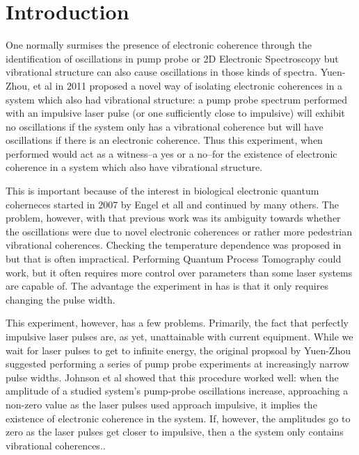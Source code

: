 \section{Introduction}
One normally surmises the presence of electronic coherence through the identification of oscillations in pump probe or 2D Electronic Spectroscopy but vibrational structure can also cause oscillations in those kinds of spectra.  Yuen-Zhou, et al\cite{witness}  in 2011 proposed a novel way of isolating electronic coherences in a system which also had vibrational structure: a pump probe spectrum performed with an impulsive laser pulse (or one sufficiently close to impulsive) will exhibit no oscillations if the system only has a vibrational coherence but will have oscillations if there is an electronic coherence.  Thus this experiment, when performed would act as a witness--a yes or a no--for the existence of electronic coherence in a system which also have vibrational structure.

This is important because of the interest in biological electronic quantum coherneces started in 2007 by Engel et all \cite{FMO1} and continued by many others\cite{Fidler2013,mech1,mech2,mech3,mech4,energyTransfer,Panitchayangkoon2011}.  The problem, however, with that previous work was its ambiguity towards whether the oscillations were due to novel electronic coherences or rather more pedestrian vibrational coherences.  Checking the temperature dependence was proposed in \cite{Perlik2014} but that is often impractical.  Performing Quantum Process Tomography could work, but it often requires more control over parameters than some laser systems are capable of\cite{QPT1,QPT2}.  The advantage the experiment in \cite{witness} has is that it only requires changing the pulse width.

This experiment, however, has a few problems.  Primarily, the fact that perfectly impulsive laser pulses are, as yet, unattainable with current equipment.  While we wait for laser pulses to get to infinite energy, the original propsoal by Yuen-Zhou suggested performing a series of pump probe experiments at increasingly narrow pulse widths.  Johnson et al\cite{allanWitness} showed that this procedure worked well: when the amplitude of a studied system's pump-probe oscillations increase, approaching a non-zero value as the laser pulses used approach impulsive, it implies the existence of electronic coherence in the system.  If, however, the amplitudes go to zero as the laser pulses get closer to impulsive, then a the system only contains vibrational coherences..

